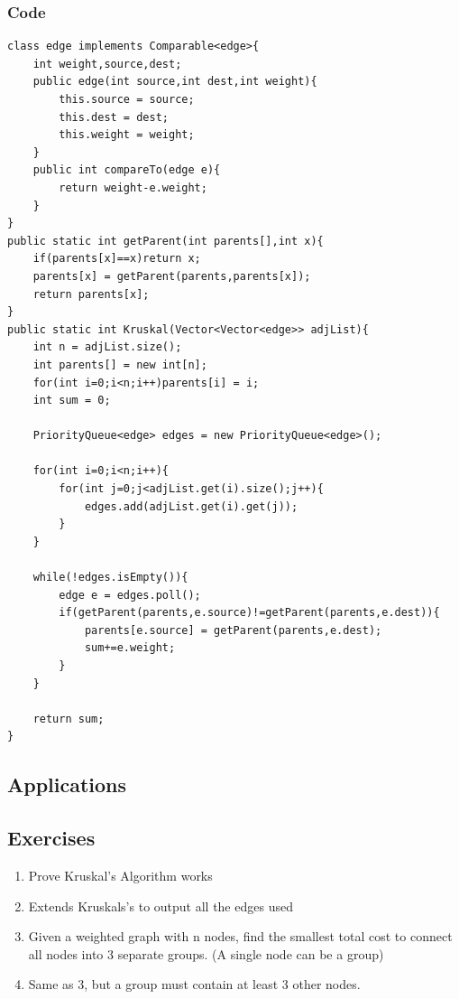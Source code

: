 \documentclass[11pt,oneside]{book}
\begin{document}
\subsubsection{Code}

\begin{lstlisting}
class edge implements Comparable<edge>{
    int weight,source,dest;
    public edge(int source,int dest,int weight){
        this.source = source;
        this.dest = dest;
        this.weight = weight;
    }
    public int compareTo(edge e){
        return weight-e.weight;
    }
}
public static int getParent(int parents[],int x){
    if(parents[x]==x)return x;
    parents[x] = getParent(parents,parents[x]);
    return parents[x];
}
public static int Kruskal(Vector<Vector<edge>> adjList){
    int n = adjList.size();
    int parents[] = new int[n];
    for(int i=0;i<n;i++)parents[i] = i;
    int sum = 0;
    
    PriorityQueue<edge> edges = new PriorityQueue<edge>();
    
    for(int i=0;i<n;i++){
        for(int j=0;j<adjList.get(i).size();j++){
            edges.add(adjList.get(i).get(j));
        }
    }
    
    while(!edges.isEmpty()){
        edge e = edges.poll();
        if(getParent(parents,e.source)!=getParent(parents,e.dest)){
            parents[e.source] = getParent(parents,e.dest);
            sum+=e.weight;
        }
    }
    
    return sum;
}
\end{lstlisting}

\subsection{Applications}

\subsection{Exercises}

\begin{enumerate}
\item Prove Kruskal's Algorithm works
\item Extends Kruskals's to output all the edges used
\item Given a weighted graph with n nodes, find the smallest total cost to connect all nodes into 3 separate groups. (A single node can be a group)
\item Same as 3, but a group must contain at least 3 other nodes.
\end{enumerate}
\end{document}
